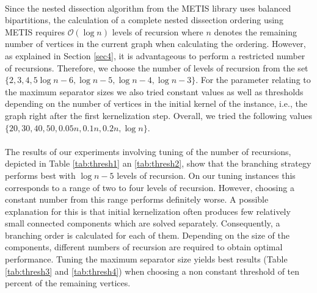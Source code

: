 \documentclass[12pt,a4paper,twoside]{scrartcl}
\numberwithin{equation}{section}
\begin{document}
\paragraph{}
Since the nested dissection algorithm from the METIS library uses balanced bipartitions, the calculation of a complete nested dissection ordering using METIS requires $\mathcal{O}(\log n)$ levels of recursion where $n$ denotes the remaining number of vertices in the current graph when calculating the ordering. However, as explained in Section \ref{sec4}, it is advantageous to perform a restricted number of recursions. Therefore, we choose the number of levels of recursion from the set $\{2,3,4,5 \log{n} - 6,\log{n} - 5,\log{n}-4,\log{n}-3\}$. For the parameter relating to the maximum separator sizes we also tried constant values as well as thresholds depending on the number of vertices in the initial kernel of the instance, i.e., the graph right after the first kernelization step. Overall, we tried the following values $\{20, 30, 40, 50, 0.05n, 0.1n, 0.2n, \log n\}$.

\paragraph{}
The results of our experiments involving tuning of the number of recursions, depicted in Table \ref{tab:thresh1} an \ref{tab:thresh2}, show that the branching strategy performs best with $\log n - 5$ levels of recursion. On our tuning instances this corresponds to a range of two to four levels of recursion. However, choosing a constant number from this range performs definitely worse. A possible explanation for this is that initial kernelization often produces few relatively small connected components which are solved separately. Consequently, a branching order is calculated for each of them. Depending on the size of the components, different numbers of recursion are required to obtain optimal performance. Tuning the maximum separator size yields best results (Table \ref{tab:thresh3} and \ref{tab:thresh4}) when choosing a non constant threshold of ten percent of the remaining vertices.
\\
\end{document}
